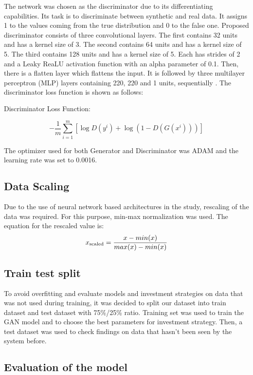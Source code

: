 \documentclass[11pt]{article} %
\begin{document}
The network was chosen as the discriminator due to its differentiating capabilities. Its task is to discriminate between synthetic and real data. It assigns 1 to the values coming from the true distribution and 0 to the false one. 
Proposed discriminator consists of three convolutional layers. The first contains 32 units and has a kernel size of 3. The second contains 64 units and has a kernel size of 5. The third contains 128 units and has a kernel size of 5. Each has strides of 2 and a Leaky ReaLU activation function with an alpha parameter of 0.1. Then, there is a flatten layer which flattens the input. It is followed by three multilayer perceptron (MLP) layers containing 220, 220 and 1 units, sequentially \cite{gan-stock}\cite{gan-stock2}. 
The discriminator loss function is shown as follows: 
\begin{center}  Discriminator Loss Function: \end{center}
\begin{equation}
-\frac{1}{m} \sum_{i=1}^{m}\left[\log D\left(y^{i}\right)+\log \left(1-D\left(G\left(x^{i}\right)\right)\right)\right]
\end{equation}

The optimizer used for both Generator and Discriminator was ADAM and the learning rate was set to 0.0016.

\subsection{Data Scaling}
Due to the use of neural network based architectures in the study, rescaling of the data was required. For this purpose, min-max normalization was used. The equation for the rescaled value is: 
\begin{equation} x\textsubscript{scaled} = \frac{x - min(x)}{max(x) - min(x)} \end{equation}

\subsection{Train test split}
To avoid overfitting and evaluate models and investment strategies on data that was not used during training, it was decided to split our dataset into train dataset and test dataset with 75\%/25\% ratio. Training set was used to train the GAN model and to choose the best parameters for investment strategy. Then, a test dataset was used to check findings on data that hasn't been seen by the system before.

\subsection{Evaluation of the model}
\end{document}
